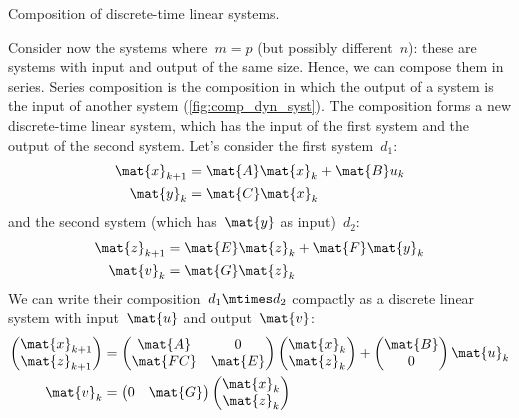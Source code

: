 \begin{marginfigure}
    \centering
    \caption{Composition of discrete-time linear systems.}
    \label{fig:comp_dyn_syst}
\end{marginfigure}
\punctuate 


Consider now the systems where~$m=p$ (but possibly different~$n$): these are systems with input and output of the same size.
Hence, we can compose them in series.
Series composition is the composition in which the output of a system is the input of another system (\cref{fig:comp_dyn_syst}).
The composition forms a new discrete-time linear system, which has the input of the first system and the output of the second system.
Let's consider the first system~$d_1$:
\begin{equation*}
    \label{eq:dlin-1}
    \begin{aligned}
        \mat{x}_{k+1} &= \mat{A} \mat{x}_k + \mat{B} u_k \\
        \mat{y}_{k}   &= \mat{C} \mat{x}_k
    \end{aligned}
\end{equation*}
and the second system (which has~$\mat{y}$ as input)~$d_2$:
\begin{equation*}
    \label{eq:dlin-2}
    \begin{aligned}
        \mat{z}_{k+1} &= \mat{E} \mat{z}_k + \mat{F} \mat{y}_k \\
        \mat{v}_{k}   &= \mat{G} \mat{z}_k
    \end{aligned}
\end{equation*}
We can write their composition~$d_1\mtimes d_2$ compactly as a discrete linear system with input~$\mat{u}$ and output~$\mat{v}$:
\begin{equation*}
    \label{eq:dlin-3}
    \begin{aligned}
        \begin{pmatrix}
            \mat{x}_{k+1} \\
            \mat{z}_{k+1}
        \end{pmatrix}&=
        \begin{pmatrix}
            \mat{A}  & 0       \\
            \mat{FC} & \mat{E}
        \end{pmatrix}\begin{pmatrix}
                         \mat{x}_k\\ \mat{z}_k
        \end{pmatrix}+
        \begin{pmatrix}
            \mat{B}\\ 0
        \end{pmatrix}\mat{u}_k\\
        \mat{v}_k&=\begin{pmatrix}
                       0& \mat{G}
        \end{pmatrix} \begin{pmatrix}
                          \mat{x}_k \\ \mat{z}_k
        \end{pmatrix}
    \end{aligned}
\end{equation*}

